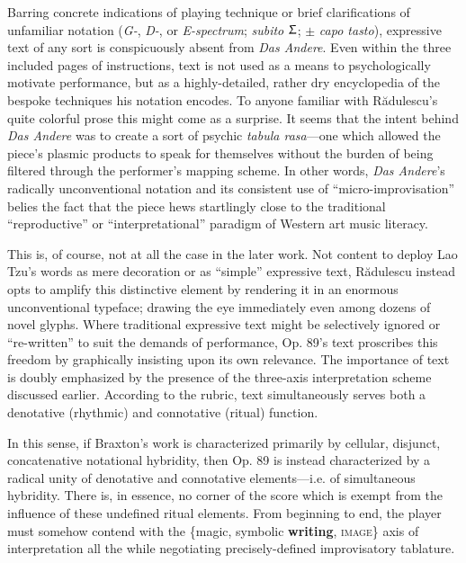         Barring concrete indications of playing technique or brief clarifications of unfamiliar notation (\textit{G-}, \textit{D-}, or \textit{E-spectrum}; \textit{subito $\Upsigma$}; $\pm$ \textit{capo tasto}), expressive text of any sort is conspicuously absent from \textit{Das Andere}. Even within the three included pages of instructions, text is not used as a means to psychologically motivate performance, but as a highly-detailed, rather dry encyclopedia of the bespoke techniques his notation encodes. To anyone familiar with R\u{a}dulescu's quite colorful prose this might come as a surprise. It seems that the intent behind \textit{Das Andere} was to create a sort of psychic \textit{tabula rasa}---one which allowed the piece's plasmic products to speak for themselves without the burden of being filtered through the performer's mapping scheme. In other words, \textit{Das Andere}'s radically unconventional notation and its consistent use of ``micro-improvisation'' belies the fact that the piece hews startlingly close to the traditional ``reproductive'' or ``interpretational'' paradigm of Western art music literacy. 

        This is, of course, not at all the case in the later work. Not content to deploy Lao Tzu's words as mere decoration or as ``simple'' expressive text, R\u{a}dulescu instead opts to amplify this distinctive element by rendering it in an enormous unconventional typeface; drawing the eye immediately even among dozens of novel glyphs. Where traditional expressive text might be selectively ignored or ``re-written'' to suit the demands of performance, Op. 89's text proscribes this freedom by graphically insisting upon its own relevance. The importance of text is doubly emphasized by the presence of the three-axis interpretation scheme discussed earlier. According to the rubric, text simultaneously serves both a denotative (rhythmic) and connotative (ritual) function.

        In this sense, if Braxton's work is characterized primarily by cellular, disjunct, concatenative notational hybridity, then Op. 89 is instead characterized by a radical unity of denotative and connotative elements---i.e. of simultaneous hybridity. There is, in essence, no corner of the score which is exempt from the influence of these undefined ritual elements. From beginning to end, the player must somehow contend with the \{magic, symbolic \textbf{writing}, \textsc{image}\} axis of interpretation all the while negotiating precisely-defined improvisatory tablature.

